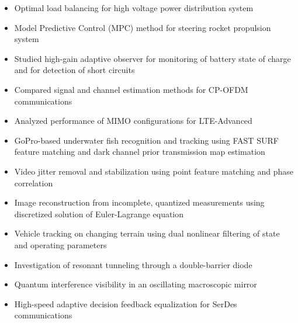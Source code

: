 \documentclass[11pt]{extarticle}
\begin{document}
\begin{itemize}[itemsep=-3pt]
\item Optimal load balancing for high voltage power distribution system
\item Model Predictive Control (MPC) method for steering rocket propulsion system
\item Studied high-gain adaptive observer for monitoring of battery state of charge and for detection of short circuits
\item Compared signal and channel estimation methods for CP-OFDM communications
\item Analyzed performance of MIMO configurations for LTE-Advanced
\item GoPro-based underwater fish recognition and tracking using FAST SURF feature matching and dark channel prior transmission map estimation
\item Video jitter removal and stabilization using point feature matching and phase correlation
\item Image reconstruction from incomplete, quantized measurements using discretized solution of Euler-Lagrange equation
\item Vehicle tracking on changing terrain using dual nonlinear filtering of state and operating parameters
\item Investigation of resonant tunneling through a double-barrier diode
\item Quantum interference visibility in an oscillating macroscopic mirror
\item High-speed adaptive decision feedback equalization for SerDes communications
\end{itemize}
\vspace{-3pt}

\end{document}
